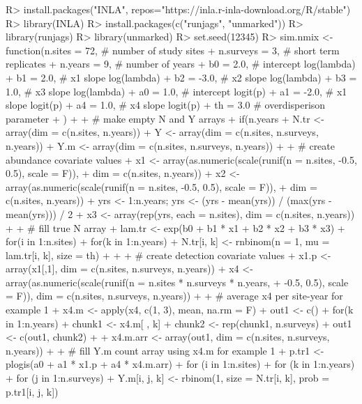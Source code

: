 \documentclass[codesnippet]{jss}
\begin{document}
\begin{CodeInput}
R> install.packages("INLA", repos="https://inla.r-inla-download.org/R/stable")
R> library(INLA)
R> install.packages(c("runjags", "unmarked"))
R> library(runjags)
R> library(unmarked)
R> set.seed(12345)
R> sim.nmix <- function(n.sites = 72,    # number of study sites
+    n.surveys = 3,                      # short term replicates
+    n.years = 9,                        # number of years
+    b0 = 2.0,                           # intercept log(lambda)
+    b1 = 2.0,                           # x1 slope log(lambda)
+    b2 = -3.0,                          # x2 slope log(lambda)
+    b3 = 1.0,                           # x3 slope log(lambda)
+    a0 = 1.0,                           # intercept logit(p)
+    a1 = -2.0,                          # x1 slope logit(p)
+    a4 = 1.0,                           # x4 slope logit(p)
+    th = 3.0                            # overdisperison parameter
+    ){
+
+    # make empty N and Y arrays
+    if(n.years %
+    N.tr <- array(dim = c(n.sites, n.years))
+    Y <- array(dim = c(n.sites, n.surveys, n.years))
+    Y.m <- array(dim = c(n.sites, n.surveys, n.years))
+
+    # create abundance covariate values
+    x1 <- array(as.numeric(scale(runif(n = n.sites, -0.5, 0.5), scale = F)),
+      dim = c(n.sites, n.years))
+    x2 <- array(as.numeric(scale(runif(n = n.sites, -0.5, 0.5), scale = F)),
+      dim = c(n.sites, n.years))
+    yrs <- 1:n.years; yrs <- (yrs - mean(yrs)) / (max(yrs - mean(yrs))) / 2
+    x3 <- array(rep(yrs, each = n.sites), dim = c(n.sites, n.years))
+
+    # fill true N array
+    lam.tr <- exp(b0 + b1 * x1 + b2 * x2 + b3 * x3)
+    for(i in 1:n.sites){
+      for(k in 1:n.years){
+        N.tr[i, k] <- rnbinom(n = 1, mu = lam.tr[i, k], size = th)
+    }}
+
+    # create detection covariate values
+    x1.p <- array(x1[,1], dim = c(n.sites, n.surveys, n.years))
+    x4 <- array(as.numeric(scale(runif(n = n.sites * n.surveys * n.years,
+      -0.5, 0.5), scale = F)), dim = c(n.sites, n.surveys, n.years))
+
+    # average x4 per site-year for example 1
+    x4.m <- apply(x4, c(1, 3), mean, na.rm = F)
+    out1 <- c()
+    for(k in 1:n.years){
+      chunk1 <- x4.m[ , k]
+      chunk2 <- rep(chunk1, n.surveys)
+      out1 <- c(out1, chunk2)
+    }
+    x4.m.arr <- array(out1, dim = c(n.sites, n.surveys, n.years))
+
+    # fill Y.m count array using x4.m for example 1
+    p.tr1 <- plogis(a0 + a1 * x1.p + a4 * x4.m.arr)
+    for (i in 1:n.sites){
+      for (k in 1:n.years){
+        for (j in 1:n.surveys){
+          Y.m[i, j, k] <- rbinom(1, size = N.tr[i, k], prob = p.tr1[i, j, k])
}}}}
\end{CodeInput}
\end{document}
